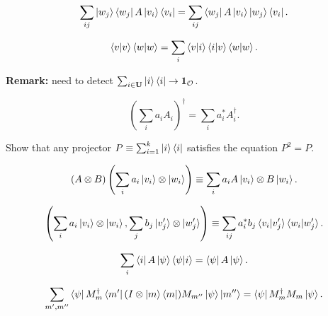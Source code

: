 \documentclass[manuscript, review, timestamp]{acmart}
\begin{document}
\begin{example}[QCQI (2.24-2.25)] \pass
  $$
  \sum_{ij} \ket{w_j}\bra{w_j}A\ket{v_i}\bra{v_i} = \sum_{ij}\bra{w_j}A\ket{v_i}\ket{w_j}\bra{v_i}.
  $$
\end{example}

\begin{example}[QCQI (2.26)] \pass
  $$
  \braket{v|v}\braket{w|w} = \sum_i\braket{v|i}\braket{i|v}\braket{w|w}.
  $$
\end{example}
\textbf{Remark:} need to detect $\sum_{i\in\mathbf{U}}\ket{i}\bra{i} \to \mathbf{1}_\mathcal{O}$.

\begin{example} \pass
  $$
  \left( \sum_i a_i A_i \right)^\dagger = \sum_i a_i^* A_i^\dagger.
  $$
\end{example}

\begin{example} \pass
  Show that any projector $P\equiv \sum_{i=1}^k \ket{i}\bra{i}$ satisfies the equation $P^2=P$.
\end{example}

\begin{example}[QCQI (2.46)] \pass
  $$
    (A \otimes B)\left(\sum_i a_i \ket{v_i}\otimes\ket{w_i}\right) \equiv \sum_i a_i A \ket{v_i} \otimes B\ket{w_i}.
  $$
\end{example}

\begin{example}[QCQI (2.49)] \pass
  $$
    \left(\sum_i a_i \ket{v_i}\otimes\ket{w_i}, \sum_j b_j \ket{v'_j}\otimes \ket{w'_j}\right) \equiv \sum_{ij}a_i^*b_j\braket{v_i|v'_j}\braket{w_i|w'_j}.
  $$
\end{example}

\begin{example}[QCQI (2.61)] \pass
  $$
    \sum_i\bra{i}A\ket{\psi}\braket{\psi|i} = \bra{\psi}A\ket{\psi}.
  $$
\end{example}


\begin{example}[QCQI (2.128)] \pass
  $$
    \sum_{m',m''}\bra{\psi}M_m^\dagger\bra{m'}(I\otimes\ket{m}\bra{m})M_{m''}\ket{\psi}\ket{m''} = \bra{\psi}M_m^\dagger M_m\ket{\psi}.
  $$
\end{example}
\end{document}
